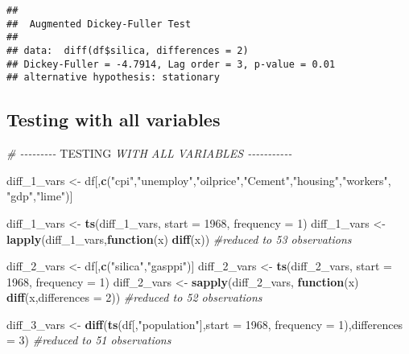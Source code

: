 \documentclass[
]{article}
\newenvironment{Shaded}{\begin{snugshade}}{\end{snugshade}}
\newcommand{\AlertTok}[1]{\textcolor[rgb]{0.94,0.16,0.16}{#1}}
\newcommand{\AttributeTok}[1]{\textcolor[rgb]{0.13,0.29,0.53}{#1}}
\newcommand{\CommentTok}[1]{\textcolor[rgb]{0.56,0.35,0.01}{\textit{#1}}}
\newcommand{\ControlFlowTok}[1]{\textcolor[rgb]{0.13,0.29,0.53}{\textbf{#1}}}
\newcommand{\DecValTok}[1]{\textcolor[rgb]{0.00,0.00,0.81}{#1}}
\newcommand{\FunctionTok}[1]{\textcolor[rgb]{0.13,0.29,0.53}{\textbf{#1}}}
\newcommand{\NormalTok}[1]{#1}
\newcommand{\OtherTok}[1]{\textcolor[rgb]{0.56,0.35,0.01}{#1}}
\newcommand{\StringTok}[1]{\textcolor[rgb]{0.31,0.60,0.02}{#1}}
\begin{document}
\begin{verbatim}
## 
##  Augmented Dickey-Fuller Test
## 
## data:  diff(df$silica, differences = 2)
## Dickey-Fuller = -4.7914, Lag order = 3, p-value = 0.01
## alternative hypothesis: stationary
\end{verbatim}

\hypertarget{testing-with-all-variables}{%
\subsection{Testing with all
variables}\label{testing-with-all-variables}}

\begin{Shaded}
\begin{Highlighting}[]
\CommentTok{\# {-}{-}{-}{-}{-}{-}{-}{-}{-} }\AlertTok{TESTING}\CommentTok{ WITH ALL VARIABLES {-}{-}{-}{-}{-}{-}{-}{-}{-}{-}{-}}

\NormalTok{diff\_1\_vars }\OtherTok{\textless{}{-}}\NormalTok{ df[,}\FunctionTok{c}\NormalTok{(}\StringTok{"cpi"}\NormalTok{,}\StringTok{"unemploy"}\NormalTok{,}\StringTok{"oilprice"}\NormalTok{,}\StringTok{"Cement"}\NormalTok{,}\StringTok{"housing"}\NormalTok{,}\StringTok{"workers"}\NormalTok{, }\StringTok{"gdp"}\NormalTok{,}\StringTok{"lime"}\NormalTok{)]}

\NormalTok{diff\_1\_vars }\OtherTok{\textless{}{-}} \FunctionTok{ts}\NormalTok{(diff\_1\_vars, }\AttributeTok{start =} \DecValTok{1968}\NormalTok{, }\AttributeTok{frequency =} \DecValTok{1}\NormalTok{)}
\NormalTok{diff\_1\_vars }\OtherTok{\textless{}{-}} \FunctionTok{lapply}\NormalTok{(diff\_1\_vars,}\ControlFlowTok{function}\NormalTok{(x) }\FunctionTok{diff}\NormalTok{(x)) }\CommentTok{\#reduced to 53 observations }

\NormalTok{diff\_2\_vars }\OtherTok{\textless{}{-}}\NormalTok{ df[,}\FunctionTok{c}\NormalTok{(}\StringTok{"silica"}\NormalTok{,}\StringTok{"gasppi"}\NormalTok{)]}
\NormalTok{diff\_2\_vars }\OtherTok{\textless{}{-}} \FunctionTok{ts}\NormalTok{(diff\_2\_vars, }\AttributeTok{start =} \DecValTok{1968}\NormalTok{, }\AttributeTok{frequency =} \DecValTok{1}\NormalTok{)}
\NormalTok{diff\_2\_vars }\OtherTok{\textless{}{-}} \FunctionTok{sapply}\NormalTok{(diff\_2\_vars, }\ControlFlowTok{function}\NormalTok{(x) }\FunctionTok{diff}\NormalTok{(x,}\AttributeTok{differences =} \DecValTok{2}\NormalTok{)) }\CommentTok{\#reduced to 52 observations }

\NormalTok{diff\_3\_vars }\OtherTok{\textless{}{-}} \FunctionTok{diff}\NormalTok{(}\FunctionTok{ts}\NormalTok{(df[,}\StringTok{"population"}\NormalTok{],}\AttributeTok{start =} \DecValTok{1968}\NormalTok{, }\AttributeTok{frequency =} \DecValTok{1}\NormalTok{),}\AttributeTok{differences =} \DecValTok{3}\NormalTok{) }\CommentTok{\#reduced to 51 observations }


\end{Highlighting}
\end{Shaded}
\end{document}
